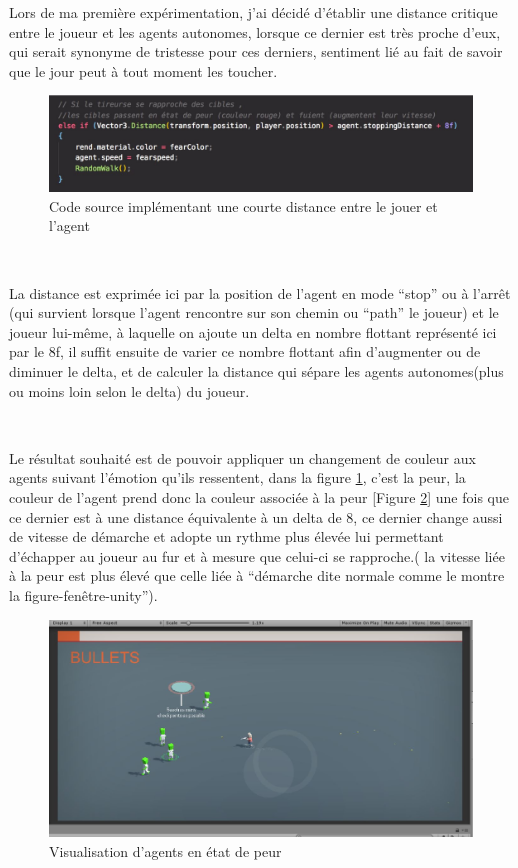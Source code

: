 Lors de ma première expérimentation, j’ai décidé d’établir une distance critique entre le joueur et les agents autonomes, lorsque ce dernier est très proche d’eux, qui serait synonyme de tristesse pour ces derniers, sentiment lié au fait de savoir que le jour peut à tout moment les toucher.


\begin{figure}[th]
\centering
\includegraphics{Figures/fonctdist.JPG}
\decoRule
\caption[Code source implémentant une courte distance ]{Code source implémentant une courte distance entre le jouer et l'agent}
\label{fig:751}
\end{figure}



~\par
La distance est exprimée ici par la position de l’agent en mode “stop” ou à l'arrêt (qui survient lorsque l’agent rencontre sur son chemin ou “path” le joueur) et le joueur lui-même, à laquelle on ajoute un delta en nombre flottant représenté ici par le 8f, il suffit ensuite de varier ce nombre flottant afin d’augmenter ou de diminuer le delta, et de calculer la distance qui sépare les agents autonomes(plus ou moins loin selon le delta) du joueur. 

~\par
Le résultat souhaité est de pouvoir appliquer un changement de couleur aux agents suivant l’émotion qu’ils ressentent, dans la figure \ref{fig:751}, c’est la peur, la couleur de l’agent prend donc la couleur associée à la peur [Figure \ref{fig:bichi1}] une fois que ce dernier est à une distance équivalente à un delta de 8, ce dernier change aussi de vitesse de démarche et adopte un rythme plus élevée lui permettant d'échapper au joueur au fur et à mesure que celui-ci se rapproche.( la vitesse liée à la peur est plus élevé que celle liée à “démarche dite normale comme le montre la figure-fenêtre-unity”).


\begin{figure}[th]
\centering
\includegraphics{Figures/bichi1.JPG}
\decoRule
\caption[Visualisation d'agents en état de peur]{Visualisation d'agents en état de peur}
\label{fig:bichi1}
\end{figure}



